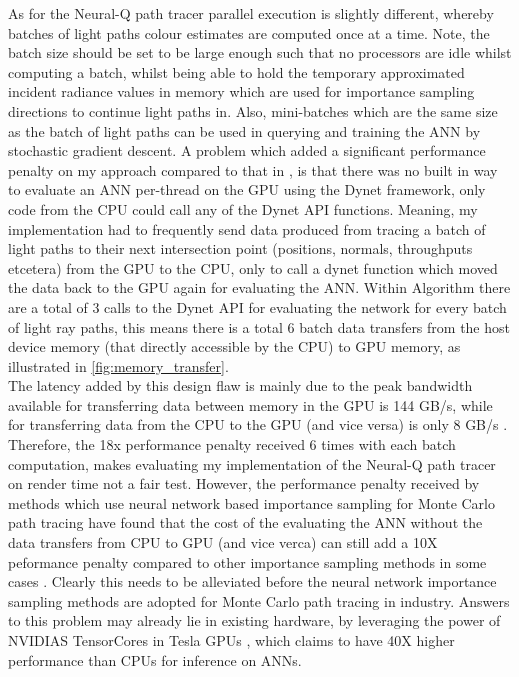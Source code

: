 \documentclass[../dissertation.tex]{subfiles}
\begin{document}
As for the Neural-Q path tracer parallel execution is slightly different, whereby batches of light paths colour estimates are computed once at a time. Note, the batch size should be set to be large enough such that no processors are idle whilst computing a batch, whilst being able to hold the temporary approximated incident radiance values in memory which are used for importance sampling directions to continue light paths in. Also, mini-batches which are the same size as the batch of light paths can be used in querying and training the ANN by stochastic gradient descent. A problem which added a significant performance penalty on my approach compared to that in \cite{muller2018neural}, is that there was no built in way to evaluate an ANN per-thread on the GPU using the Dynet framework, only code from the CPU could call any of the Dynet API functions. Meaning, my implementation had to frequently send data produced from tracing a batch of light paths to their next intersection point (positions, normals, throughputs etcetera) from the GPU to the CPU, only to call a dynet function which moved the data back to the GPU again for evaluating the ANN. Within Algorithm \cite{alg:neural_q_path_tracer} there are a total of $3$ calls to the Dynet API for evaluating the network for every batch of light ray paths, this means there is a total $6$ batch data transfers from the host device memory (that directly accessible by the CPU) to GPU memory, as illustrated in \ref{fig:memory_transfer}. \\


The latency added by this design flaw is mainly due to the peak bandwidth available for transferring data between memory in the GPU is 144 GB/s, while for transferring data from the CPU to the GPU (and vice versa) is only 8 GB/s \cite{global_data_transfer}. Therefore, the 18x performance penalty received $6$ times with each batch computation, makes evaluating my implementation of the Neural-Q path tracer on render time not a fair test. However, the performance penalty received by methods which use neural network based importance sampling for Monte Carlo path tracing have found that the cost of the evaluating the ANN without the data transfers from CPU to GPU (and vice verca) can still add a 10X peformance penalty compared to other importance sampling methods in some cases \cite{muller2018neural, keller2019integral}. Clearly this needs to be alleviated before the neural network importance sampling methods are adopted for Monte Carlo path tracing in industry. Answers to this problem may already lie in existing hardware, by leveraging the power of NVIDIAS TensorCores in Tesla GPUs \cite{tensor_cores}, which claims to have 40X higher performance than CPUs for inference on ANNs.
\end{document}
